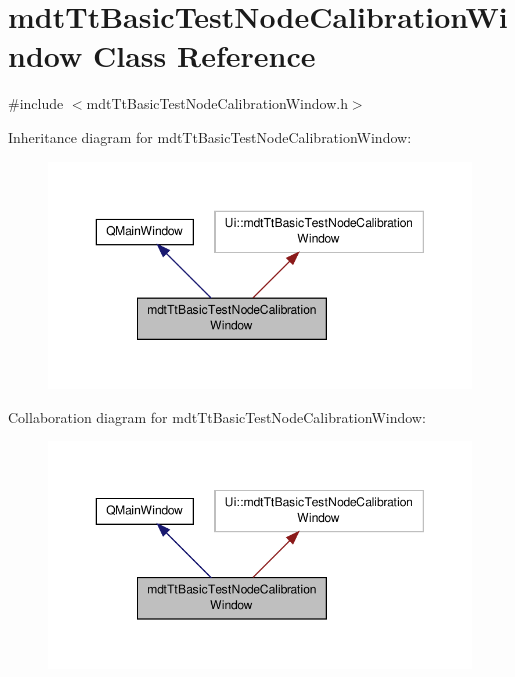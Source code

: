 \hypertarget{classmdt_tt_basic_test_node_calibration_window}{\section{mdt\-Tt\-Basic\-Test\-Node\-Calibration\-Window Class Reference}
\label{classmdt_tt_basic_test_node_calibration_window}
}


{\ttfamily \#include $<$mdt\-Tt\-Basic\-Test\-Node\-Calibration\-Window.\-h$>$}



Inheritance diagram for mdt\-Tt\-Basic\-Test\-Node\-Calibration\-Window\-:
\nopagebreak
\begin{figure}[H]
\begin{center}
\leavevmode
\includegraphics[width=350pt]{classmdt_tt_basic_test_node_calibration_window__inherit__graph}
\end{center}
\end{figure}


Collaboration diagram for mdt\-Tt\-Basic\-Test\-Node\-Calibration\-Window\-:
\nopagebreak
\begin{figure}[H]
\begin{center}
\leavevmode
\includegraphics[width=350pt]{classmdt_tt_basic_test_node_calibration_window__coll__graph}
\end{center}
\end{figure}
